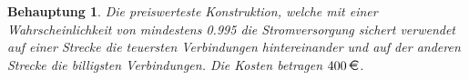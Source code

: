 \documentclass[a4paper]{scrartcl}
\newtheorem*{behaupt}{Behauptung}
\begin{document}
\begin{enumerate}[label=\bfseries\arabic*.]
                \begin{behaupt}
                    Die preiswerteste Konstruktion, welche mit einer
                    Wahrscheinlichkeit von mindestens \num{0.995} die
                    Stromversorgung sichert verwendet auf einer Strecke die
                    teuersten Verbindungen hintereinander und auf der anderen
                    Strecke die billigsten Verbindungen.
                    Die Kosten betragen $400\,\text{\EUR}$.
                \end{behaupt}

\end{enumerate}
\end{document}
